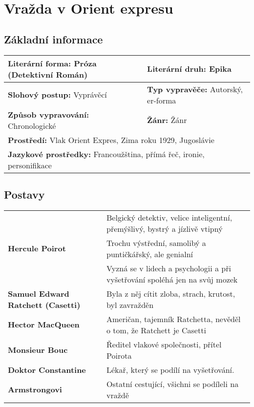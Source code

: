 \section{Vražda v Orient expresu}
\label{sec:orientexpres}
\subsection*{Základní informace}
\begin{tabularx}{\linewidth}{l|l}
  \textbf{Literární forma:} Próza (Detektivní Román) & \textbf{Literární druh:} Epika               \\
  \hline
  \textbf{Slohový postup:} Vyprávěcí                 & \textbf{Typ vypravěče:} Autorský, er-forma   \\
  \hline
  \textbf{Způsob vypravování:} Chronologické         & \textbf{Žánr:} Žánr                          \\
  \hline
  \multicolumn{2}{l}{\textbf{Prostředí:} Vlak Orient Expres, Zima roku 1929, Jugoslávie}            \\
  \hline
  \multicolumn{2}{l}{\textbf{Jazykové prostředky:} Francoužština, přímá řeč, ironie, personifikace} \\
\end{tabularx}
\subsection*{Postavy}
\begin{tabularx}{\linewidth}{l|l}
  \multirow{3}{15em}{\textbf{Hercule Poirot}} & Belgický detektiv, velice inteligentní, přemýšlivý, bystrý a jízlivě vtipný \\
                                              & Trochu výstřední, samolibý a puntičkářský, ale genialní                     \\
                                              & Vyzná se v lidech a psychologii a při vyšetřování spoléhá jen na svůj mozek \\
  \hline
  \textbf{Samuel Edward Ratchett (Casetti)}   & Byla z něj cítit zloba, strach, krutost, byl zavražděn                      \\
  \hline
  \textbf{Hector MacQueen}                    & Američan, tajemník Ratchetta, nevěděl o tom, že Ratchett je Casetti         \\
  \hline
  \textbf{Monsieur Bouc}                      & Ředitel vlakové společnosti, přítel Poirota                                 \\
  \hline
  \textbf{Doktor Constantine}                 & Lékař, který se podílí na vyšetřování.                                      \\
  \hline
  \textbf{Armstrongovi}                       & Ostatní cestující, všichni se podíleli na vraždě                            \\
\end{tabularx}
